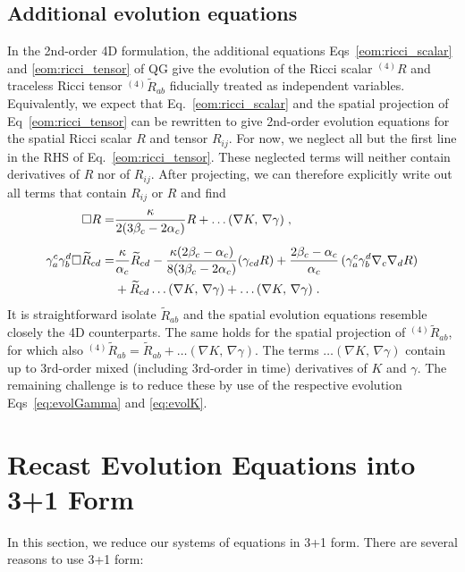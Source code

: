 \documentclass[a4paper,oneside,openany,11pt]{memoir}
\numberwithin{equation}{section} %
\begin{document}
{\subsection{Additional evolution equations}
In the 2nd-order 4D formulation, the additional equations Eqs~\eqref{eom:ricci_scalar} and \eqref{eom:ricci_tensor} of QG give the evolution of the Ricci scalar $^{(4)}R$ and traceless Ricci tensor $^{(4)}\widetilde{R}_{ab}$ fiducially treated as independent variables. Equivalently, we expect that Eq.~\eqref{eom:ricci_scalar} and the spatial projection of Eq~\eqref{eom:ricci_tensor} can be rewritten to give 2nd-order evolution equations for the spatial Ricci scalar $R$ and tensor $R_{ij}$. For now, we neglect all but the first line in the RHS of Eq.~\eqref{eom:ricci_tensor}. These neglected terms will neither contain derivatives of $R$ nor of $R_{ij}$. After projecting, we can therefore explicitly write out all terms that contain $R_{ij}$ or $R$ and find
\begin{align}
	\Box R 
	=& 
	\frac{\kappa}{2(3\beta_c-2\alpha_c)} R
	+ \dots(\nabla K,\,\nabla\gamma)\;,
	\\[0.5em]
	\gamma_a^c\gamma_b^d\Box
	\widetilde{R}_{cd}
	=& 
	\frac{\kappa}{\alpha_c}
	\widetilde{R}_{cd}
	-\frac{\kappa(2\beta_c-\alpha_c)}{8(3\beta_c-2\alpha_c)}(\gamma_{cd}R)
	+\frac{2\beta_c-\alpha_c}{\alpha_c}\,(\gamma_a^c\gamma_b^d\nabla_c\nabla_dR)
	\notag\\	
	&+ \widetilde{R}_{cd}\dots(\nabla K,\,\nabla\gamma) + \dots(\nabla K,\,\nabla\gamma)\;.
\end{align}
It is straightforward isolate $\widetilde{R}_{ab}$ and the spatial evolution equations resemble closely the 4D counterparts. The same holds for the spatial projection of $^{(4)}\widetilde{R}_{ab}$, for which also $^{(4)}\widetilde{R}_{ab} = \widetilde{R}_{ab} + \dots(\nabla K,\,\nabla\gamma)$. The terms $\dots(\nabla K,\,\nabla\gamma)$ contain up to 3rd-order mixed (including 3rd-order in time) derivatives of $K$ and $\gamma$. The remaining challenge is to reduce these by use of the respective evolution Eqs~\eqref{eq:evolGamma} and \eqref{eq:evolK}.
}


\section{Recast Evolution Equations into 3+1 Form}

In this section, we reduce our systems of equations in 3+1 form. There are several reasons to use 3+1 form:
\end{document}
